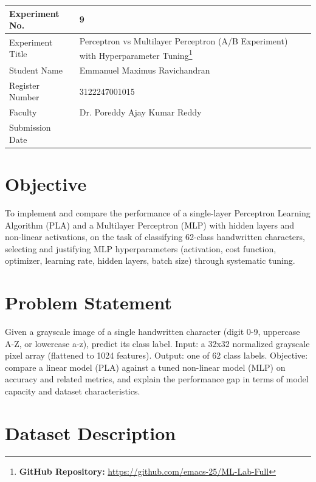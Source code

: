 \documentclass[11pt]{article}
\author{root}
\date{\today}
\title{}
\begin{document}
\begin{center}
\begin{tabular}{|p{4cm}|p{11cm}|}
\hline
Experiment No. & 9\\[0pt]
\hline
Experiment Title & Perceptron vs Multilayer Perceptron (A/B Experiment) with Hyperparameter Tuning\footnote{\textbf{GitHub Repository: }\url{https://github.com/emacs-25/ML-Lab-Full}}\\[0pt]
\hline
Student Name & Emmanuel Maximus Ravichandran\\[0pt]
\hline
Register Number & 3122247001015\\[0pt]
\hline
Faculty & Dr. Poreddy Ajay Kumar Reddy\\[0pt]
\hline
Submission Date & \\[0pt]
\hline
\end{tabular}
\end{center}

\section{Objective}
\label{sec:orgebe8c2c}

To implement and compare the performance of a single-layer Perceptron Learning Algorithm
(PLA) and a Multilayer Perceptron (MLP) with hidden layers and non-linear activations, on
the task of classifying 62-class handwritten characters, selecting and justifying MLP
hyperparameters (activation, cost function, optimizer, learning rate, hidden layers, batch
size) through systematic tuning.

\section{Problem Statement}
\label{sec:org69b36aa}

Given a grayscale image of a single handwritten character (digit 0-9, uppercase A-Z, or
lowercase a-z), predict its class label. Input: a 32x32 normalized grayscale pixel array
(flattened to 1024 features). Output: one of 62 class labels. Objective: compare a linear
model (PLA) against a tuned non-linear model (MLP) on accuracy and related metrics, and
explain the performance gap in terms of model capacity and dataset characteristics.

\section{Dataset Description}
\label{sec:org1f865f0}
\end{document}

